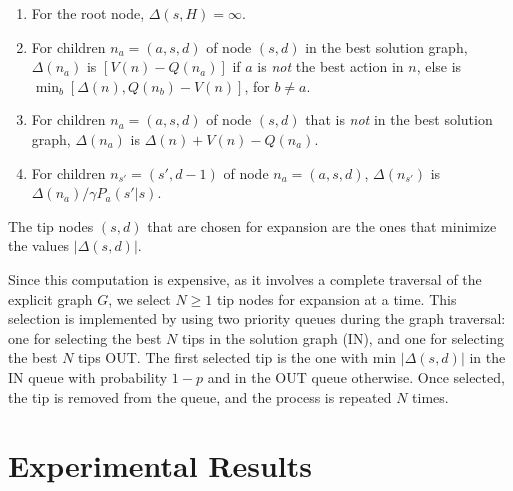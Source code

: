 \documentclass[letterpaper]{article}
\newcommand{\Omit}[1]{}
\begin{document}
\begin{enumerate}[1.]
\item For the root node,  $\Delta(s,H)=\infty$.
\item For children $n_a = (a,s,d)$ of node $(s,d)$
in the best solution graph, $\Delta(n_a)$ is $[V(n)-Q(n_a)]$
if $a$ is \emph{not} the best action in $n$, else is
$\min_b[\Delta(n),Q(n_b)-V(n)]$, for $b \not= a$.
\item For children $n_a = (a,s,d)$ of node $(s,d)$
that is \emph{not} in the best solution graph, $\Delta(n_a)$ is $\Delta(n) + V(n) - Q(n_a)$.
\item For children $n_{s'} = (s',d-1)$ of node $n_a = (a,s,d)$, $\Delta(n_{s'})$
is $\Delta(n_a)/\gamma P_a(s'|s)$.
\end{enumerate}



The tip nodes  $(s,d)$ that are  chosen for expansion
are the ones that minimize  the values $|\Delta(s,d)|$.
\Omit{
if the choice is IN, they are selected among the tip nodes
in the best solution graph, if the choice is OUT, among those
not in the best solution graph.  }
Since this  computation is expensive, as  it involves a
complete traversal of the explicit graph $G$,
we select  $N\geq 1$ tip nodes for expansion at a time.
This selection  is implemented by using two priority queues during the graph traversal:
one for selecting the best $N$  tips in the solution graph (IN),  and one for selecting the best $N$ tips OUT.
The first selected tip  is the one with  min $|\Delta(s,d)|$ in the IN queue with  probability $1-p$ and in the OUT queue otherwise.
Once selected, the tip is removed from the queue, and the process is repeated $N$ times.%

\section{Experimental Results}
\end{document}
